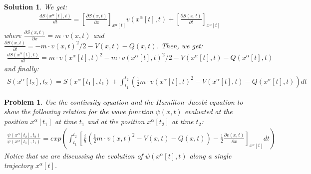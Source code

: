 \documentclass[nofootinbib, secnumarabic, amsmath, nobibnotes,11pt,aps,pra, floatfix]{revtex4-1}
\newtheorem{problem}{Problem}
\newtheorem{solution}{Solution}
\begin{document}
\begin{solution}
We get: 
\begin{eqnarray}
\frac {dS(x^{\alpha}[t],t)}{dt}=\left[\frac {\partial S(x,t)}{\partial x}\right]_{x^{\alpha}[t]}v(x^{\alpha}[t],t)+\left[\frac {\partial S(x,t)}{\partial t}\right]_{x^{\alpha}[t]}\nonumber
\end{eqnarray}
where $\frac {\partial S(x,t)}{\partial x}=m\cdot v(x,t)$ and $\frac {\partial S(x,t)}{\partial t}=-m\cdot v(x,t)^2/2-V(x,t)-Q(x,t)$. Then, we get:
\begin{eqnarray}
\frac {dS(x^{\alpha}[t],t)}{dt}=m \cdot v(x^{\alpha}[t],t)^2-m\cdot v(x^{\alpha}[t],t)^2/2-V(x^{\alpha}[t],t)-Q(x^{\alpha}[t],t)\nonumber
\end{eqnarray}
and finally:
\begin{eqnarray}
S(x^{\alpha}[t_2],t_2)=S(x^{\alpha}[t_1],t_1) +\int_{t_1}^{t_2}\left( \frac{1}{2}m\cdot v(x^{\alpha}[t],t)^2 -V(x^{\alpha}[t],t)-Q(x^{\alpha}[t],t)\right)dt \nonumber
\end{eqnarray}
\end{solution}

\begin{problem} \label{om.P11}
Use the continuity equation and the Hamilton--Jacobi equation to show the following relation for the wave function $\psi(x,t)$ evaluated at the position $x^{\alpha}[t_1]$ at time $t_1$ and at the position $x^{\alpha}[t_2]$ at time $t_2$:
\begin{eqnarray}
\frac{\psi(x^{\alpha}[t_2],t_2)}{\psi(x^{\alpha}[t_1],t_1)}=exp\left( \int_{t_1}^{t_2}\left[ \frac{i}{\hbar} \left(\frac{1}{2}m\cdot v(x,t)^2 -V(x,t)-Q(x,t)\right)-\frac{1}{2}\frac{\partial v(x,t)}{\partial x}\right]_{x^{\alpha}[t]} dt \right) \nonumber
\end{eqnarray}
Notice that we are discussing the evolution of $\psi(x^{\alpha}[t],t)$ along a single trajectory  $x^{\alpha}[t]$.
\end{problem}
\end{document}
